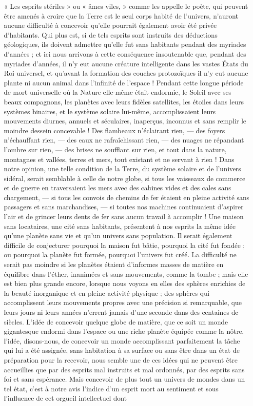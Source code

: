 \documentclass[a4paper, 11pt, oneside, landscape]{article}
\begin{document}
« Les esprits stériles » ou « âmes viles, » comme les appelle le poète, qui peuvent être amenés à croire que la Terre est le seul corps habité de l'univers, n'auront aucune difficulté à concevoir qu'elle pourrait également avoir été privée d'habitants. Qui plus est, si de tels esprits sont instruits des déductions géologiques, ils doivent admettre qu'elle fut sans habitants pendant des myriades d'années ; et ici nous arrivons à cette conséquence insoutenable que, pendant des myriades d'années, il n'y eut aucune créature intelligente dans les vastes États du Roi universel, et qu'avant la formation des couches protozoïques il n'y eut aucune plante ni aucun animal dans l'infinité de l'espace ! Pendant cette longue période de mort universelle où la Nature elle-même était endormie, le Soleil avec ses beaux compagnons, les planètes avec leurs fidèles satellites, les étoiles dans leurs systèmes binaires, et le système solaire lui-même, accomplissaient leurs mouvements diurnes, annuels et séculaires, inaperçus, inconnus et sans remplir le moindre dessein concevable ! Des flambeaux n'éclairant rien, --- des foyers n'échauffant rien, --- des eaux ne rafraîchissant rien, --- des nuages ne répandant l'ombre sur rien, --- des brises ne soufflant sur rien, et tout dans la nature, montagnes et vallées, terres et mers, tout existant et ne servant à rien ! Dans notre opinion, une telle condition de la Terre, du système solaire et de l'univers sidéral, serait semblable à celle de notre globe, si tous les vaisseaux de commerce et de guerre en traversaient les mers avec des cabines vides et des cales sans chargement, --- si tous les convois de chemins de fer étaient en pleine activité sans passagers et sans marchandises, --- si toutes nos machines continuaient d'aspirer l'air et de grincer leurs dents de fer sans aucun travail à accomplir ! Une maison sans locataires, une cité sans habitants, présentent à nos esprits la même idée qu'une planète sans vie et qu'un univers sans population. Il serait également difficile de conjecturer pourquoi la maison fut bâtie, pourquoi la cité fut fondée ; ou pourquoi la planète fut formée, pourquoi l'univers fut créé. La difficulté ne serait pas moindre si les planètes étaient d'informes masses de matière en équilibre dans l'éther, inanimées et sans mouvements, comme la tombe ; mais elle est bien plus grande encore, lorsque nous voyons en elles des sphères enrichies de la beauté inorganique et en pleine activité physique ; des sphères qui accomplissent leurs mouvements propres avec une précision si remarquable, que leurs jours ni leurs années n'errent jamais d'une seconde dans des centaines de siècles. L'idée de concevoir quelque globe de matière, que ce soit un monde gigantesque endormi dans l'espace ou une riche planète équipée comme la nôtre, l'idée, disons-nous, de concevoir un monde accomplissant parfaitement la tâche qui lui a été assignée, sans habitation à sa surface ou sans être dans un état de préparation pour la recevoir, nous semble une de ces idées qui ne peuvent être accueillies que par des esprits mal instruits et mal ordonnés, par des esprits sans foi et sans espérance. Mais concevoir de plus tout un univers de mondes dans un tel état, c'est à notre avis l'indice d'un esprit mort au sentiment et sous l'influence de cet orgueil intellectuel dont 
\end{document}
